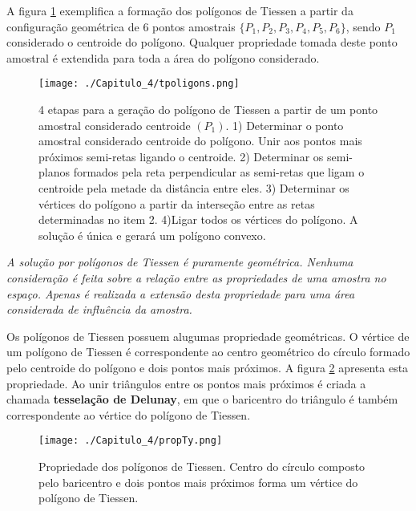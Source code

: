 A figura \ref{tiessen} exemplifica a formação dos polígonos de Tiessen a partir da configuração geométrica de 6 pontos amostrais $\{P_{1},P_{2},P_{3},P_{4},P_{5},P_{6}\}$, sendo $P_{1}$ considerado o centroide do polígono. Qualquer propriedade tomada deste ponto amostral é extendida para toda a área do polígono considerado. 

\FloatBarrier
\begin{figure}[!htpb]
	\centering
	\texttt{[image: ./Capitulo\_4/tpoligons.png]}	
	\caption{4 etapas para a geração do polígono de Tiessen a partir de um ponto amostral considerado centroide $(P_{1})$. 1) Determinar o ponto amostral considerado centroide do polígono. Unir aos pontos mais próximos semi-retas ligando o centroide. 2) Determinar os semi-planos formados pela reta perpendicular as semi-retas que ligam o centroide pela metade da distância entre eles. 3) Determinar os vértices do polígono a partir da interseção entre as retas determinadas no item 2. 4)Ligar todos os vértices do polígono. A solução é única e gerará um polígono convexo.  }
	\label{tiessen}
\end{figure}
\FloatBarrier 

\begin{proposition}
	\textit{A solução por polígonos de Tiessen é puramente geométrica. Nenhuma consideração é feita sobre a relação entre as propriedades de uma amostra no espaço. Apenas é realizada a extensão desta propriedade para uma área considerada de influência da amostra.} 
\end{proposition}

Os polígonos de Tiessen possuem alugumas propriedade geométricas. O vértice de um polígono de Tiessen é correspondente ao centro geométrico do círculo formado pelo centroide do polígono e dois pontos mais próximos. A figura  \ref{tiessen2} apresenta esta propriedade. Ao unir triângulos entre os pontos mais próximos é criada a chamada \textbf{tesselação de Delunay}, em que o baricentro do triângulo é também correspondente ao vértice do polígono de Tiessen. 

 

\FloatBarrier
\begin{figure}[!htpb]
	\centering
	\texttt{[image: ./Capitulo\_4/propTy.png]}	
	\caption{Propriedade dos polígonos de Tiessen. Centro do círculo composto pelo baricentro e dois pontos mais próximos forma um vértice do polígono de Tiessen.}
	\label{tiessen2}
\end{figure}
\FloatBarrier 

